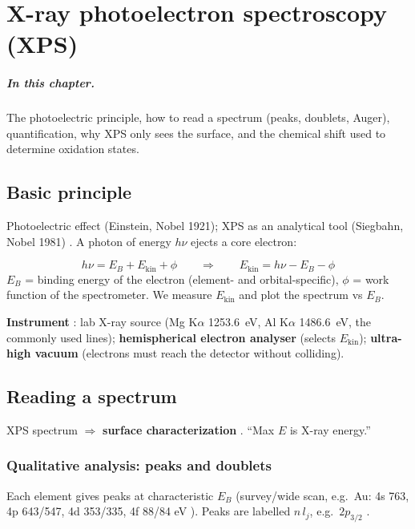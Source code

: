 \chapter{X-ray photoelectron spectroscopy (XPS)}
\label{ch:xps}

\paragraph{In this chapter.} The photoelectric principle, how to read a spectrum (peaks, doublets, Auger), quantification,
why XPS only sees the surface, and the chemical shift used to determine oxidation states.

\section{Basic principle}
Photoelectric effect (Einstein, Nobel 1921); XPS as an analytical tool (Siegbahn, Nobel 1981) .
A photon of energy $h\nu$ ejects a core electron:
\begin{keybox}
\begin{equation}
h\nu = E_B + E_\mathrm{kin} + \phi \qquad\Longrightarrow\qquad \boxed{E_\mathrm{kin} = h\nu - E_B - \phi}
\label{eq:xps}
\end{equation}
$E_B$ = binding energy of the electron (element- and orbital-specific), $\phi$ = work function of the spectrometer.
We measure $E_\mathrm{kin}$ and plot the spectrum vs $E_B$.
\end{keybox}
\textbf{Instrument} : lab X-ray source (Mg K$\alpha$ \SI{1253.6}{eV}, Al K$\alpha$ \SI{1486.6}{eV}, the
commonly used lines); \textbf{hemispherical electron analyser} (selects $E_\mathrm{kin}$); \textbf{ultra-high vacuum}
(electrons must reach the detector without colliding).

\section{Reading a spectrum}
\begin{classbox}
XPS spectrum $\Rightarrow$ \textbf{surface characterization} . ``Max $E$ is X-ray energy.''
\end{classbox}
\subsection{Qualitative analysis: peaks and doublets}
Each element gives peaks at characteristic $E_B$ (survey/wide scan, e.g.\ Au: 4s 763, 4p 643/547, 4d 353/335,
4f 88/84 eV ). Peaks are labelled $n\,l_j$, e.g.\ $2p_{3/2}$ .

